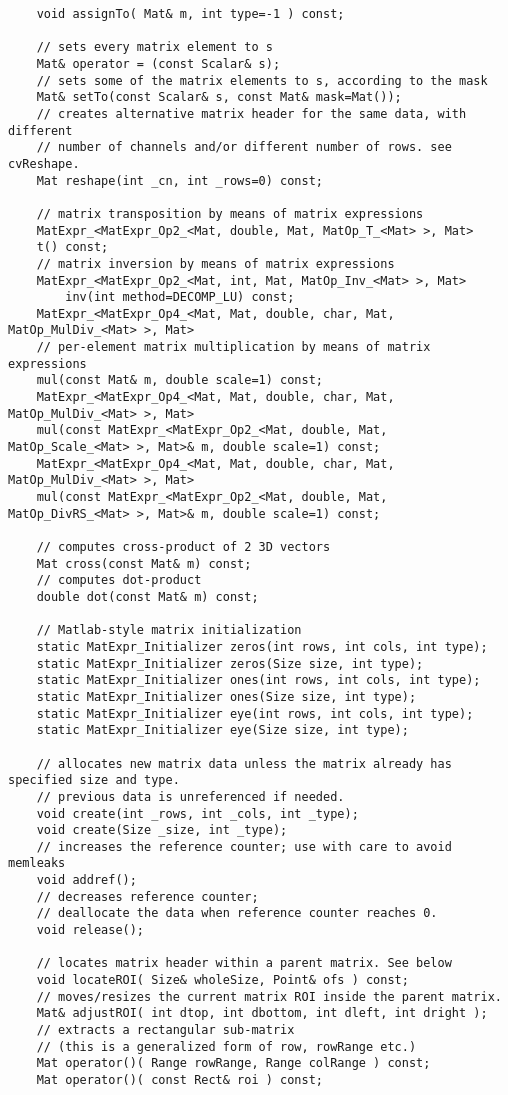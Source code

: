 \begin{lstlisting}
    void assignTo( Mat& m, int type=-1 ) const;

    // sets every matrix element to s
    Mat& operator = (const Scalar& s);
    // sets some of the matrix elements to s, according to the mask
    Mat& setTo(const Scalar& s, const Mat& mask=Mat());
    // creates alternative matrix header for the same data, with different
    // number of channels and/or different number of rows. see cvReshape.
    Mat reshape(int _cn, int _rows=0) const;

    // matrix transposition by means of matrix expressions
    MatExpr_<MatExpr_Op2_<Mat, double, Mat, MatOp_T_<Mat> >, Mat>
    t() const;
    // matrix inversion by means of matrix expressions
    MatExpr_<MatExpr_Op2_<Mat, int, Mat, MatOp_Inv_<Mat> >, Mat>
        inv(int method=DECOMP_LU) const;
    MatExpr_<MatExpr_Op4_<Mat, Mat, double, char, Mat, MatOp_MulDiv_<Mat> >, Mat>
    // per-element matrix multiplication by means of matrix expressions
    mul(const Mat& m, double scale=1) const;
    MatExpr_<MatExpr_Op4_<Mat, Mat, double, char, Mat, MatOp_MulDiv_<Mat> >, Mat>
    mul(const MatExpr_<MatExpr_Op2_<Mat, double, Mat, MatOp_Scale_<Mat> >, Mat>& m, double scale=1) const;
    MatExpr_<MatExpr_Op4_<Mat, Mat, double, char, Mat, MatOp_MulDiv_<Mat> >, Mat>    
    mul(const MatExpr_<MatExpr_Op2_<Mat, double, Mat, MatOp_DivRS_<Mat> >, Mat>& m, double scale=1) const;

    // computes cross-product of 2 3D vectors
    Mat cross(const Mat& m) const;
    // computes dot-product
    double dot(const Mat& m) const;

    // Matlab-style matrix initialization
    static MatExpr_Initializer zeros(int rows, int cols, int type);
    static MatExpr_Initializer zeros(Size size, int type);
    static MatExpr_Initializer ones(int rows, int cols, int type);
    static MatExpr_Initializer ones(Size size, int type);
    static MatExpr_Initializer eye(int rows, int cols, int type);
    static MatExpr_Initializer eye(Size size, int type);

    // allocates new matrix data unless the matrix already has specified size and type.
    // previous data is unreferenced if needed.
    void create(int _rows, int _cols, int _type);
    void create(Size _size, int _type);
    // increases the reference counter; use with care to avoid memleaks
    void addref();
    // decreases reference counter;
    // deallocate the data when reference counter reaches 0.
    void release();

    // locates matrix header within a parent matrix. See below
    void locateROI( Size& wholeSize, Point& ofs ) const;
    // moves/resizes the current matrix ROI inside the parent matrix.
    Mat& adjustROI( int dtop, int dbottom, int dleft, int dright );
    // extracts a rectangular sub-matrix
    // (this is a generalized form of row, rowRange etc.)
    Mat operator()( Range rowRange, Range colRange ) const;
    Mat operator()( const Rect& roi ) const;


\end{lstlisting}
